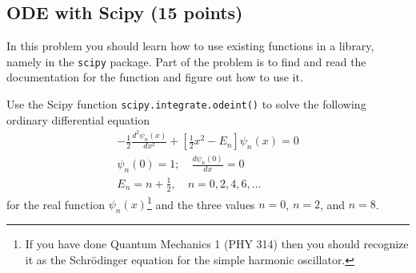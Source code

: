 \documentclass[letterpaper]{scrartcl}
\begin{document}
\subsection{ODE with Scipy (15 points)}
\label{sec:ode}

In this problem you should learn how to use existing functions in a
library, namely in the \texttt{scipy} package. Part of the problem is
to find and read the documentation for the function and figure out how
to use it.

Use the Scipy function \texttt{scipy.integrate.odeint()} to solve the
following ordinary differential equation 
\begin{gather}
  \label{eq:schrodinger}
  -\frac{1}{2}\frac{d^{2}\psi_{n}(x)}{dx^{2}} + \left[\frac{1}{2}
    x^{2} - E_{n}\right] \psi_{n}(x) = 0\\
  \label{eq:initial}
  \psi_{n}(0) = 1;\quad \frac{d\psi_{n}(0)}{dx} = 0\\
  \label{eq:energies}
  E_{n} = n + \frac{1}{2}, \quad n = 0, 2, 4, 6, \dots
\end{gather}
for the real function $\psi_{n}(x) $\footnote{If you have done Quantum
  Mechanics 1 (PHY 314) then you should recognize it as the
  Schr{\"o}dinger equation for the simple harmonic oscillator.} and the
three values $n=0$, $n=2$, and $n=8$.
\end{document}
